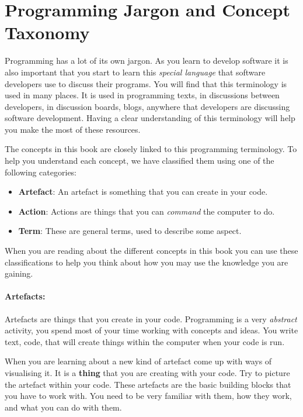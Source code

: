 \section*{Programming Jargon and Concept Taxonomy} %
\label{sub:concept_taxonomy}

Programming has a lot of its own jargon. As you learn to develop software it is also important that you start to learn this \emph{special language} that software developers use to discuss their programs. You will find that this terminology is used in many places. It is used in programming texts, in discussions between developers, in discussion boards, blogs, anywhere that developers are discussing software development. Having a clear understanding of this terminology will help you make the most of these resources.

The concepts in this book are closely linked to this programming terminology. To help you understand each concept, we have classified them using one of the following categories:

\begin{itemize}
  \item \textbf{Artefact}: An artefact is something that you can create in your code.
  \item \textbf{Action}: Actions are things that you can \emph{command} the computer to do.
  \item \textbf{Term}: These are general terms, used to describe some aspect.
\end{itemize}

When you are reading about the different concepts in this book you can use these classifications to help you think about how you may use the knowledge you are gaining.

\paragraph{Artefacts:} %
\label{par:artefacts}

Artefacts are things that you create in your code. Programming is a very \emph{abstract} activity, you spend most of your time working with concepts and ideas. You write text, code, that will create things within the computer when your code is run. 

When you are learning about a new kind of artefact come up with ways of visualising it. It is a \textbf{thing} that you are creating with your code. Try to picture the artefact within your code. These artefacts are the basic building blocks that you have to work with. You need to be very familiar with them, how they work, and what you can do with them.

